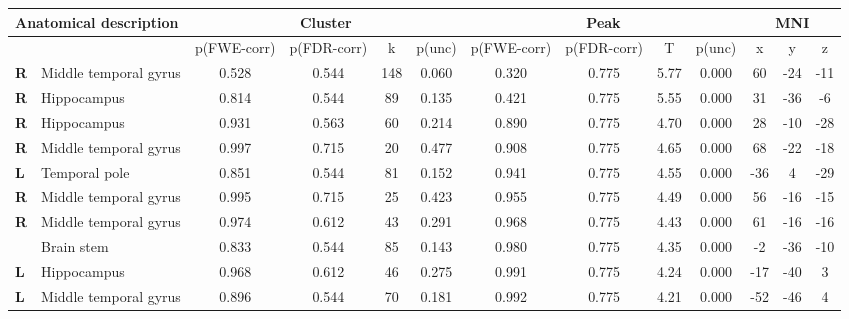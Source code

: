 \begin{landscape}
\begin{table}[!ht]
    \vspace*{-4cm}
    \raggedright
\begin{tabular}{ll|cccc|cccc|ccc} \\ \hline
        \multicolumn{2}{l}{\textbf{Anatomical description}} & \multicolumn{4}{c}{\textbf{Cluster}} & \multicolumn{4}{c}{\textbf{Peak}} &  \multicolumn{3}{c}{\textbf{MNI}} \\ \hline
        \multicolumn{2}{l}{\textbf{}} & \multicolumn{1}{l}{p(FWE-corr)} & p(FDR-corr) & k & \multicolumn{1}{l}{p(unc)} & p(FWE-corr) & p(FDR-corr) & T & \multicolumn{1}{l}{p(unc)} & x & y & z \\ \hline
        \textbf{R} & Middle temporal gyrus & 0.528 & 0.544 & 148 & 0.060 & 0.320 & 0.775 & 5.77 & 0.000 & 60 & -24 & -11 \\
        \textbf{R} & Hippocampus & 0.814 & 0.544 & 89 & 0.135 & 0.421 & 0.775 & 5.55 & 0.000 & 31 & -36 & -6 \\
        \textbf{R} & Hippocampus & 0.931 & 0.563 & 60 & 0.214 & 0.890 & 0.775 & 4.70 & 0.000 & 28 & -10 & -28 \\
        \textbf{R} & Middle temporal gyrus & 0.997 & 0.715 & 20 & 0.477 & 0.908 & 0.775 & 4.65 & 0.000 & 68 & -22 & -18 \\
        \textbf{L} & Temporal pole & 0.851 & 0.544 & 81 & 0.152 & 0.941 & 0.775 & 4.55 & 0.000 & -36 & 4 & -29 \\
        \textbf{R} & Middle temporal gyrus & 0.995 & 0.715 & 25 & 0.423 & 0.955 & 0.775 & 4.49 & 0.000 & 56 & -16 & -15 \\
        \textbf{R} & Middle temporal gyrus & 0.974 & 0.612 & 43 & 0.291 & 0.968 & 0.775 & 4.43 & 0.000 & 61 & -16 & -16 \\
        \textbf{} & Brain stem & 0.833 & 0.544 & 85 & 0.143 & 0.980 & 0.775 & 4.35 & 0.000 & -2 & -36 & -10 \\
        \textbf{L} & Hippocampus & 0.968 & 0.612 & 46 & 0.275 & 0.991 & 0.775 & 4.24 & 0.000 & -17 & -40 & 3 \\
        \textbf{L} & Middle temporal gyrus & 0.896 & 0.544 & 70 & 0.181 & 0.992 & 0.775 & 4.21 & 0.000 & -52 & -46 & 4 \\

\end{tabular}
\end{table}
\end{landscape}

